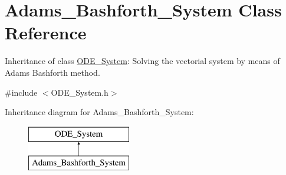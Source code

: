 \hypertarget{class_adams___bashforth___system}{}\section{Adams\+\_\+\+Bashforth\+\_\+\+System Class Reference}
\label{class_adams___bashforth___system}


Inheritance of class \mbox{\hyperlink{class_o_d_e___system}{O\+D\+E\+\_\+\+System}}\+: Solving the vectorial system by means of Adams Bashforth method.  




{\ttfamily \#include $<$O\+D\+E\+\_\+\+System.\+h$>$}

Inheritance diagram for Adams\+\_\+\+Bashforth\+\_\+\+System\+:\begin{figure}[H]
\begin{center}
\leavevmode
\includegraphics[height=2.000000cm]{class_adams___bashforth___system}
\end{center}
\end{figure}
